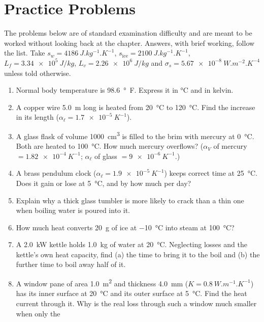 \section{Practice Problems}\label{sec:practice-thermal}

The problems below are of standard examination difficulty and are meant to be worked without looking
back at the chapter. Answers, with brief working, follow the list. Take $s_w=\SI{4186}{J.kg^{-1}.K^{-1}}$,
$s_{\text{ice}}=\SI{2100}{J.kg^{-1}.K^{-1}}$, $L_f=\SI{3.34e5}{J/kg}$, $L_v=\SI{2.26e6}{J/kg}$ and
$\sigma_{\!s}=\SI{5.67e-8}{W.m^{-2}.K^{-4}}$ unless told otherwise.

\begin{enumerate}[itemsep=3pt]
\item Normal body temperature is \SI{98.6}{\degree F}. Express it in \si{\celsius} and in kelvin.
\item A copper wire \SI{5.0}{m} long is heated from \SI{20}{\celsius} to \SI{120}{\celsius}. Find the
      increase in its length ($\alpha_\ell=\SI{1.7e-5}{K^{-1}}$).
\item A glass flask of volume \SI{1000}{cm^3} is filled to the brim with mercury at \SI{0}{\celsius}.
      Both are heated to \SI{100}{\celsius}. How much mercury overflows?
      ($\alpha_V$ of mercury $=\SI{1.82e-4}{K^{-1}}$; $\alpha_\ell$ of glass $=\SI{9e-6}{K^{-1}}$.)
\item A brass pendulum clock ($\alpha_\ell=\SI{1.9e-5}{K^{-1}}$) keeps correct time at
      \SI{25}{\celsius}. Does it gain or lose at \SI{5}{\celsius}, and by how much per day?
\item Explain why a thick glass tumbler is more likely to crack than a thin one when boiling water is
      poured into it.
\item How much heat converts \SI{20}{g} of ice at \SI{-10}{\celsius} into steam at \SI{100}{\celsius}?
\item A \SI{2.0}{kW} kettle holds \SI{1.0}{kg} of water at \SI{20}{\celsius}. Neglecting losses and the
      kettle's own heat capacity, find (a) the time to bring it to the boil and (b) the further time to
      boil away half of it.
\item A window pane of area \SI{1.0}{m^2} and thickness \SI{4.0}{mm} ($K=\SI{0.8}{W.m^{-1}.K^{-1}}$)
      has its inner surface at \SI{20}{\celsius} and its outer surface at \SI{5}{\celsius}. Find the
      heat current through it. Why is the real loss through such a window much smaller when only the

\end{enumerate}
